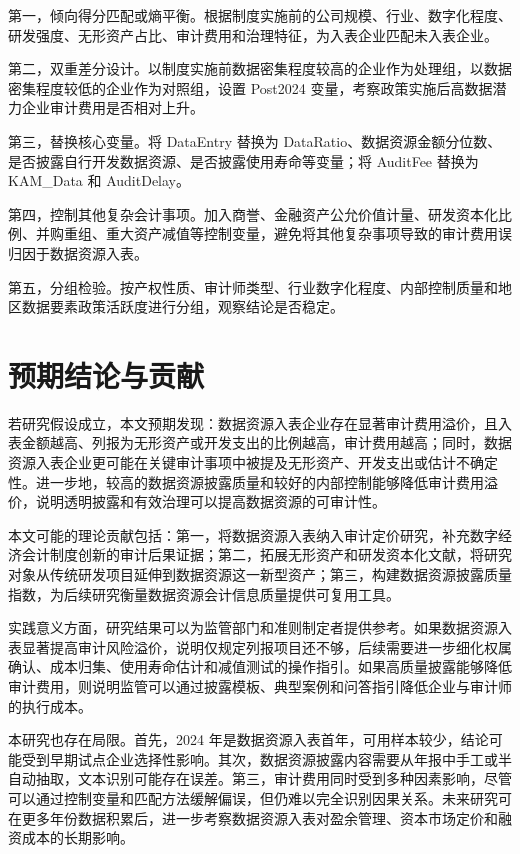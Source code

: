 \documentclass[UTF8,zihao=-4,a4paper]{ctexart}
\begin{document}
第一，倾向得分匹配或熵平衡。根据制度实施前的公司规模、行业、数字化程度、研发强度、无形资产占比、审计费用和治理特征，为入表企业匹配未入表企业。

第二，双重差分设计。以制度实施前数据密集程度较高的企业作为处理组，以数据密集程度较低的企业作为对照组，设置 Post2024 变量，考察政策实施后高数据潜力企业审计费用是否相对上升。

第三，替换核心变量。将 DataEntry 替换为 DataRatio、数据资源金额分位数、是否披露自行开发数据资源、是否披露使用寿命等变量；将 AuditFee 替换为 KAM\_Data 和 AuditDelay。

第四，控制其他复杂会计事项。加入商誉、金融资产公允价值计量、研发资本化比例、并购重组、重大资产减值等控制变量，避免将其他复杂事项导致的审计费用误归因于数据资源入表。

第五，分组检验。按产权性质、审计师类型、行业数字化程度、内部控制质量和地区数据要素政策活跃度进行分组，观察结论是否稳定。

\section{预期结论与贡献}

若研究假设成立，本文预期发现：数据资源入表企业存在显著审计费用溢价，且入表金额越高、列报为无形资产或开发支出的比例越高，审计费用越高；同时，数据资源入表企业更可能在关键审计事项中被提及无形资产、开发支出或估计不确定性。进一步地，较高的数据资源披露质量和较好的内部控制能够降低审计费用溢价，说明透明披露和有效治理可以提高数据资源的可审计性。

本文可能的理论贡献包括：第一，将数据资源入表纳入审计定价研究，补充数字经济会计制度创新的审计后果证据；第二，拓展无形资产和研发资本化文献，将研究对象从传统研发项目延伸到数据资源这一新型资产；第三，构建数据资源披露质量指数，为后续研究衡量数据资源会计信息质量提供可复用工具。

实践意义方面，研究结果可以为监管部门和准则制定者提供参考。如果数据资源入表显著提高审计风险溢价，说明仅规定列报项目还不够，后续需要进一步细化权属确认、成本归集、使用寿命估计和减值测试的操作指引。如果高质量披露能够降低审计费用，则说明监管可以通过披露模板、典型案例和问答指引降低企业与审计师的执行成本。

本研究也存在局限。首先，2024 年是数据资源入表首年，可用样本较少，结论可能受到早期试点企业选择性影响。其次，数据资源披露内容需要从年报中手工或半自动抽取，文本识别可能存在误差。第三，审计费用同时受到多种因素影响，尽管可以通过控制变量和匹配方法缓解偏误，但仍难以完全识别因果关系。未来研究可在更多年份数据积累后，进一步考察数据资源入表对盈余管理、资本市场定价和融资成本的长期影响。
\end{document}
